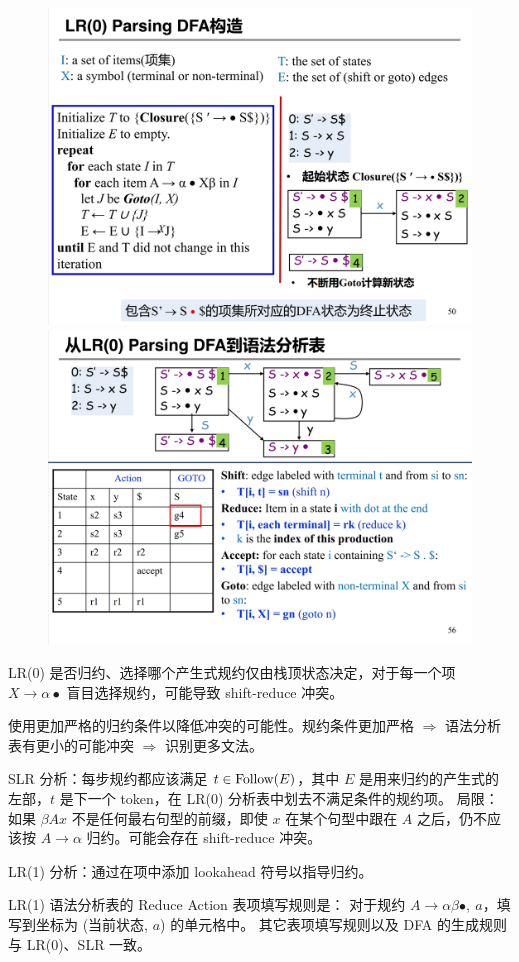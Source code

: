 \begin{figure}[H]
    \centering
    \includegraphics[width=0.48\linewidth]{figures/lr0-3.png}
    \includegraphics[width=0.48\linewidth]{figures/lr0-4.png}
\end{figure}

\par \noindent LR(0) 是否归约、选择哪个产生式规约仅由栈顶状态决定，对于每一个项 $X \rightarrow \alpha \bullet$ 盲目选择规约，可能导致 shift-reduce 冲突。

\par \noindent 使用更加严格的归约条件以降低冲突的可能性。规约条件更加严格 $\Rightarrow$ 语法分析表有更小的可能冲突 $\Rightarrow$ 识别更多文法。

\par \noindent SLR 分析：每步规约都应该满足 $t \in \operatorname{Follow}(E)$，其中 $E$ 是用来归约的产生式的左部，$t$ 是下一个 token，在 LR(0) 分析表中划去不满足条件的规约项。
局限：如果 $\beta A x$ 不是任何最右句型的前缀，即使 $x$ 在某个句型中跟在 $A$ 之后，仍不应该按 $A \rightarrow \alpha$ 归约。可能会存在 shift-reduce 冲突。

\par \noindent LR(1) 分析：通过在项中添加 lookahead 符号以指导归约。

\par \noindent LR(1) 语法分析表的 Reduce Action 表项填写规则是：
对于规约 $A \rightarrow \alpha \beta \bullet,\ a$，填写到坐标为 (当前状态, $a$) 的单元格中。
其它表项填写规则以及 DFA 的生成规则与 LR(0)、SLR 一致。

